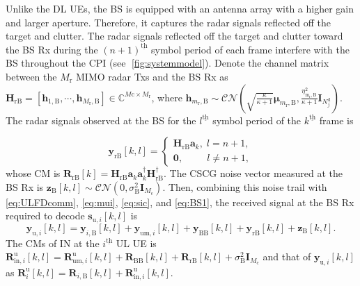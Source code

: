 \documentclass[9pt,journal]{IEEEtran}
\newcommand{\paren}[1]{\left({#1}\right)}
\newcommand{\bracket}[1]{{\left [{#1}\right ]}}
\newcommand{\ith}[1]    {{#1}^{\underline{\text{th}}}}
\newcommand{\rr}{_\mathrm{r}}
\newcommand{\cc}{_\mathrm{c}}
\newcommand{\B}{\textrm{B}}
\theoremstyle{definition}
\begin{document}
Unlike the DL UEs, the BS is equipped with an antenna array with a higher gain and larger aperture. Therefore, it captures the radar signals reflected off the target and clutter. The radar signals reflected off the target and clutter toward the BS Rx during the $\ith{\paren{n+1}}$ symbol period of each frame interfere with the BS throughout the CPI (see \figurename{$\;$\ref{fig:systemmodel}}). Denote the channel matrix between the $\mathit{M}\rr$ MIMO radar Txs and the BS Rx as $\mathbf{H}_{\textrm{rB}}=\bracket{\mathbf{h}_{1,\textrm{B}},\cdots,\mathbf{h}_{\mathit{M}\rr,\textrm{B}}}\in\mathbb{C}^{\mathit{M}\textrm{c}\times \mathit{M}\rr}$, where $\mathbf{h}_{m\rr,\textrm{B}}\sim\mathcal{CN}\paren{\sqrt{\frac{\kappa}{\kappa+1}}\boldsymbol{\mu}_{m\rr,\textrm{B}},\frac{\eta^2_{\mathrm{m\rr},\textrm{B}}}{\kappa+1}\mathbf{I}_{\mathit{N}^{\textrm{d}}_j}}$. The radar signals observed at the BS for the $\ith{l}$ symbol period of the $\ith{k}$ frame is\par\noindent\small
\begin{equation}
    \mathbf{y}_{\textrm{rB}}\bracket{k,l}=
    \begin{cases}
    \mathbf{H}_{\mathrm{rB}}\mathbf{a}_k, \;l=n+1,\\
    \mathbf{0}, \qquad~~ l\neq n+1,
    \end{cases}\label{eq:BS1}
\end{equation}
\normalsize
whose  %
CM is $\mathbf{R}_{\mathrm{rB}}\bracket{k}=\mathbf{H}_{\textrm{rB}}\mathbf{a}_k\mathbf{a}^\dagger_k\mathbf{H}^\dagger_{\textrm{rB}}$. The CSCG noise vector measured at the BS Rx is $\mathbf{z}_\textrm{B}\bracket{k,l}\sim\mathcal{CN}\paren{0,\sigma^2_{\textrm{B}}\mathbf{I}_{M\cc}}$. Then, combining this noise trail with \eqref{eq:ULFDcomm}, \eqref{eq:mui}, \eqref{eq:sic}, and \eqref{eq:BS1}, the received signal at the BS Rx required to decode $\mathbf{s}_{\textrm{u},i}\bracket{k,l}$ is \begin{equation*}
    \mathbf{y}_{\textrm{u},i}\bracket{k,l}=\mathbf{y}_{i,\B}\bracket{k,l}+\mathbf{y}_{\textrm{um},i}\bracket{k,l}+\mathbf{y}_{\textrm{BB}}\bracket{k,l}+\mathbf{y}_{\textrm{rB}}\bracket{k,l}+\mathbf{z}_\textrm{B}\bracket{k,l}.
\end{equation*}
The CMs of IN at the $\ith{i}$ UL UE is $\mathbf{R}^\textrm{u}_{\mathrm{in},i}\bracket{k,l}=\mathbf{R}^\textrm{u}_{\textrm{um}, i}\bracket{k,l}+\mathbf{R}_{\mathrm{BB}}\bracket{k,l}+\mathbf{R}_{\textrm{rB}}\bracket{k,l}+\sigma^2_{\textrm{B}}\mathbf{I}_{\mathit{M}\cc}$ and that of $\mathbf{y}_{\textrm{u},i}\bracket{k,l}$ as $\mathbf{R}^\mathrm{u}_{i}\bracket{k,l}=\mathbf{R}_{i,\B}\bracket{k,l}+\mathbf{R}^\textrm{u}_{\mathrm{in},i}\bracket{k,l}$.  
\end{document}
